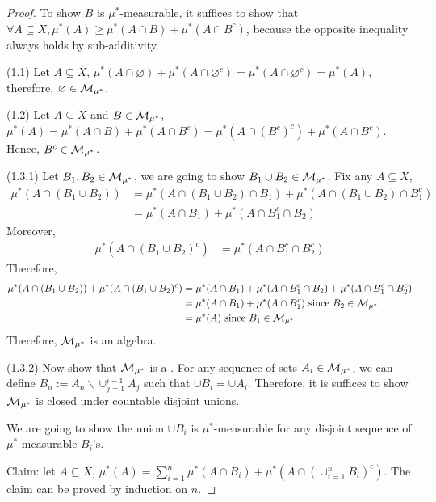 \documentclass[11pt]{article}
\begin{document}
	\begin{proof}
		To show $B$ is $\mu^*$-measurable, it suffices to show that $\forall A \subseteq X, \mu^*(A) \geq \mu^*(A \cap B) + \mu^*(A \cap B^c)$, because the opposite inequality always holds by sub-additivity.
		
		(1.1) Let $A \subseteq X$, $\mu^*(A \cap \varnothing) + \mu^*(A \cap \varnothing^c) = \mu^*(A \cap \varnothing^c) = \mu^*(A)$, therefore, $\varnothing \in \mathcal{{M}}_{\mu^*}$.
		
		(1.2) Let $A \subseteq X$ and $B \in \mathcal{{M}}_{\mu^*}$, $\mu^*(A) = \mu^*(A \cap B) + \mu^*(A \cap B^c) = \mu^*(A \cap (B^c)^c) + \mu^*(A \cap B^c)$. Hence, $B^c \in \mathcal{{M}}_{\mu^*}$.
		
		(1.3.1) Let $B_1, B_2 \in \mathcal{{M}}_{\mu^*}$, we are going to show $B_1 \cup B_2 \in \mathcal{{M}}_{\mu^*}$.
		Fix any $A \subseteq X$, 
		\begin{align}
			\mu^*(A \cap (B_1 \cup B_2)) &= \mu^*(A \cap (B_1 \cup B_2) \cap B_1) + \mu^*(A \cap (B_1 \cup B_2) \cap B_1^c) \\
			&= \mu^*(A \cap B_1) + \mu^*(A \cap B_1^c \cap B_2)
		\end{align}
		Moreover,
		\begin{align}
			\mu^*(A \cap (B_1 \cup B_2)^c) &= \mu^*(A \cap B_1^c \cap B_2^c)
		\end{align}
		Therefore,
		\begin{align}
			\mu^*(A \cap (B_1 \cup B_2)) + \mu^*(A \cap (B_1 \cup B_2)^c) &= \mu^*(A \cap B_1) + \mu^*(A \cap B_1^c \cap B_2) +  \mu^*(A \cap B_1^c \cap B_2^c) \\
			&= \mu^*(A \cap B_1) + \mu^*(A \cap B_1^c) \text{{ since }} B_2 \in \mathcal{{M}}_{\mu^*} \\
			&= \mu^*(A) \text{{ since }} B_1 \in \mathcal{{M}}_{\mu^*}
		\end{align}
		Therefore, $\mathcal{{M}}_{\mu^*}$ is an algebra.
		
		(1.3.2) Now show that $\mathcal{{M}}_{\mu^*}$ is a \salg. For any sequence of sets $A_i \in \mathcal{{M}}_{\mu^*}$, we can define $B_n := A_n \backslash \cup_{j=1}^{i-1} A_j$ such that $\cup B_i = \cup A_i$.
		Therefore, it is suffices to show $\mathcal{{M}}_{\mu^*}$ is closed under countable disjoint unions.
		
		We are going to show the union $\cup B_i$ is $\mu^*$-measurable for any disjoint sequence of $\mu^*$-measurable $B_i$'s.
		
		Claim: let $A \subseteq X$, $\mu^*(A) = \sum_{i=1}^n \mu^*(A \cap B_i) + \mu^*(A \cap (\cup_{i=1}^n B_i)^c)$.
		The claim can be proved by induction on $n$.
		

\end{proof}
\end{document}
